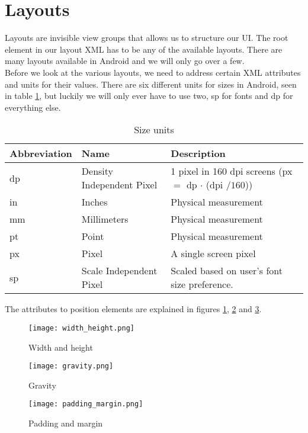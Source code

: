 \section{Layouts}
Layouts are invisible view groups that allows us to structure our UI. The root element in our layout XML has to be any of the available layouts. There are many layouts available in Android and we will only go over a few.\\

Before we look at the various layouts, we need to address certain XML attributes and units for their values. There are six different units for sizes in Android, seen in table \ref{table:units}, but luckily we will only ever have to use two, sp for fonts and dp for everything else.

\begin{table}[H]
    \centering
    \begin{tabular}{l|l|l}
        Abbreviation & Name & Description \\ 
        \hline
        dp & Density Independent Pixel & 1 pixel in 160 dpi screens (px $=$ dp $\cdot$ (dpi $/ 160$)) \\
        in & Inches & Physical measurement \\
        mm & Millimeters & Physical measurement \\
        pt & Point & Physical measurement \\
        px & Pixel & A single screen pixel \\
        sp & Scale Independent Pixel & Scaled based on user’s font size preference.
    \end{tabular}
    \caption{Size units}
    \label{table:units}
\end{table}%

The attributes to position elements are explained in figures \ref{fig:wah}, \ref{fig:grav} and \ref{fig:pam}.

\begin{figure}[H]
  \centering
  \texttt{[image: width\_height.png]}
  \caption{Width and height}
  \label{fig:wah}
\end{figure}
\begin{figure}[H]
  \centering
  \texttt{[image: gravity.png]}
  \caption{Gravity}
  \label{fig:grav}
\end{figure}
\begin{figure}[H]
  \centering
  \texttt{[image: padding\_margin.png]}
  \caption{Padding and margin}
  \label{fig:pam}
\end{figure}



